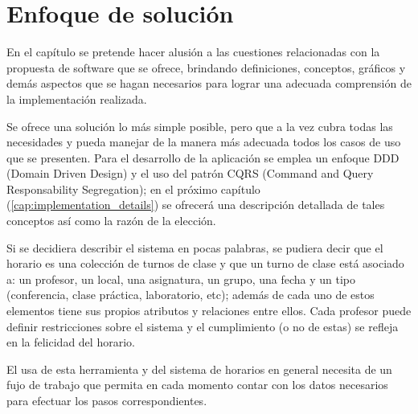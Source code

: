 \chapter{Enfoque de solución}

En el capítulo se pretende hacer alusión a las cuestiones relacionadas con la propuesta de software que se ofrece, brindando definiciones, conceptos, gráficos y demás aspectos que se hagan necesarios para lograr una adecuada comprensión de la implementación realizada.

Se ofrece una solución lo más simple posible, pero que a la vez cubra todas las necesidades y pueda manejar de la manera más adecuada todos los casos de uso que se presenten. Para el desarrollo de la aplicación se emplea un enfoque DDD (Domain Driven Design) y el uso del patrón CQRS (Command and Query Responsability Segregation); en el próximo capítulo (\ref{cap:implementation_details}) se ofrecerá una descripción detallada de tales conceptos así como la razón de la elección.

Si se decidiera describir el sistema en pocas palabras, se pudiera decir que el horario es una colección de turnos de clase y que un turno de clase está asociado a: un profesor, un local, una asignatura, un grupo, una fecha y un tipo (conferencia, clase práctica, laboratorio, etc); además de cada uno de estos elementos tiene sus propios atributos y relaciones entre ellos. Cada profesor puede definir restricciones sobre el sistema y el cumplimiento (o no de estas) se refleja en la felicidad del horario.


El usa de esta herramienta y del sistema de horarios en general necesita de un fujo de trabajo que permita en cada momento contar con los datos necesarios para efectuar los pasos correspondientes.

